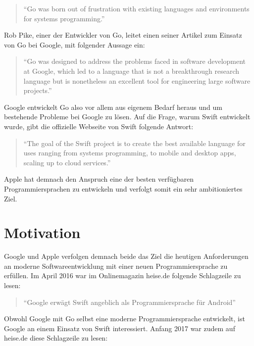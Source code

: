 \begin{quote}
\enquote{Go was born out of frustration with existing languages and environments for systems programming.}\cite{Golang.FAQ}
\end{quote}

Rob Pike, einer der Entwickler von Go, leitet einen seiner Artikel zum Einsatz von Go bei Google, mit folgender Aussage ein:

\begin{quote}
\enquote{Go was designed to address the problems faced in software development at Google, which led to a language that is not a breakthrough research language but is nonetheless an excellent tool for engineering large software projects.}\cite{RobPike.2012}
\end{quote}

Google entwickelt Go also vor allem aus eigenem Bedarf heraus und um bestehende Probleme bei Google zu lösen.
Auf die Frage, warum Swift entwickelt wurde, gibt die offizielle Webseite von Swift folgende Antwort:

\begin{quote}
\enquote{The goal of the Swift project is to create the best available language for uses ranging from systems programming, to mobile and desktop apps, scaling up to cloud services.}\cite{Swift.Homepage}
\end{quote}

Apple hat demnach den Anspruch eine der besten verfügbaren Programmiersprachen zu entwickeln und verfolgt somit ein sehr ambitioniertes Ziel.

\section{Motivation}
Google und Apple verfolgen demnach beide das Ziel die heutigen Anforderungen an moderne Softwareentwicklung mit einer neuen Programmiersprache zu erfüllen.  
Im April 2016 war im Onlinemagazin heise.de folgende Schlagzeile zu lesen:

\begin{quote}
\enquote{Google erwägt Swift angeblich als Programmiersprache für Android}\cite{Becker}
\end{quote}

Obwohl Google mit Go selbst eine moderne Programmiersprache entwickelt, ist Google an einem Einsatz von Swift interessiert.
Anfang 2017 war zudem auf heise.de diese Schlagzeile zu lesen:

